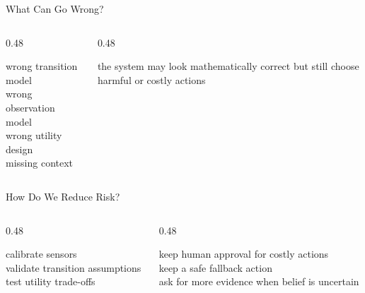 \documentclass[aspectratio=169]{beamer}
\begin{document}
\begin{frame}{What Can Go Wrong?}
\begin{columns}[T,onlytextwidth]
  \begin{column}{0.48\textwidth}
    \begin{tcolorbox}[colback=questionbg,colframe=questionframe,boxrule=0.7pt,title=Common problems]
    wrong transition model\\
    wrong observation model\\
    wrong utility design\\
    missing context
    \end{tcolorbox}
  \end{column}
  \begin{column}{0.48\textwidth}
    \begin{tcolorbox}[colback=plainbg,colframe=plainframe,boxrule=0.7pt,title=Why it matters]
    the system may look mathematically correct but still choose harmful or costly actions
    \end{tcolorbox}
  \end{column}
\end{columns}
\end{frame}

\begin{frame}{How Do We Reduce Risk?}
\begin{columns}[T,onlytextwidth]
  \begin{column}{0.48\textwidth}
    \begin{tcolorbox}[colback=plainbg,colframe=plainframe,boxrule=0.7pt,title=Model checks]
    calibrate sensors\\
    validate transition assumptions\\
    test utility trade-offs
    \end{tcolorbox}
  \end{column}
  \begin{column}{0.48\textwidth}
    \begin{tcolorbox}[colback=questionbg,colframe=questionframe,boxrule=0.7pt,title=Decision checks]
    keep human approval for costly actions\\
    keep a safe fallback action\\
    ask for more evidence when belief is uncertain
    \end{tcolorbox}
  \end{column}
\end{columns}
\end{frame}
\end{document}
